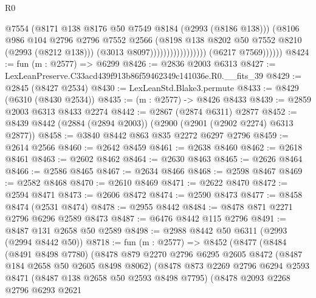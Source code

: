 \begin{lexlean}{R0}
\begin{coremodule}
                                            @7554
                                            (@8171 @138 @8176 @50 @7549 @8184 (@2993 (@8186 @138)))
                                            (@8106
                                              @986
                                              @104
                                              @2796
                                              @2796
                                              @7552
                                              @2566
                                              (@8198
                                                @138
                                                @8202
                                                @50
                                                @7552
                                                @8210
                                                (@2993 (@8212 @138)))
                                              (@3013 @8097)))))))))))))))))
              (@6217 @7569))))))
@8424 := fun (m : @2577) => @6299
@8426 := @2836 @2003 @6313
@8427 := LexLeanPreserve.C33acd439f913b86f59462349c141036e.R0.__fits_39
@8429 := @2845 (@8427 @2534)
@8430 := LexLeanStd.Blake3.permute
@8433 := @8429 (@6310 (@8430 @2534))
@8435 := (m : @2577) -> @8426 @8433
@8439 := @2859 @2003 @6313 @8433 @2274
@8442 := @2867 (@2874 @6311) @2877
@8452 := @8439 @8442 (@2884 (@2894 @2003)) (@2900 (@2901 (@2902 @2274) @6313 @2877))
@8458 := @3840 @8442 @863 @835 @2272 @6297 @2796
@8459 := @2614 @2566
@8460 := @2642 @8459
@8461 := @2638 @8460
@8462 := @2618 @8461
@8463 := @2602 @8462
@8464 := @2630 @8463
@8465 := @2626 @8464
@8466 := @2586 @8465
@8467 := @2634 @8466
@8468 := @2598 @8467
@8469 := @2582 @8468
@8470 := @2610 @8469
@8471 := @2622 @8470
@8472 := @2594 @8471
@8473 := @2606 @8472
@8474 := @2590 @8473
@8477 := @8458 @8474 (@2531 @8474)
@8478 := @2955 @8442
@8484 := @8478 @871 @2271 @2796 @6296 @2589 @8473
@8487 := @6476 @8442 @115 @2796
@8491 := @8487 @131 @2658 @50 @2589
@8498 := @2988 @8442 @50 @6311 (@2993 (@2994 @8442 @50))
@8718 := fun (m : @2577) =>
  @8452
    (@8477
      (@8484
        (@8491 @8498 @7780)
        (@8478
          @879
          @2270
          @2796
          @6295
          @2605
          @8472
          (@8487 @184 @2658 @50 @2605 @8498 @8062)
          (@8478
            @873
            @2269
            @2796
            @6294
            @2593
            @8471
            (@8487 @138 @2658 @50 @2593 @8498 @7795)
            (@8478
              @2093
              @2268
              @2796
              @6293
              @2621

\end{coremodule}
\end{lexlean}
